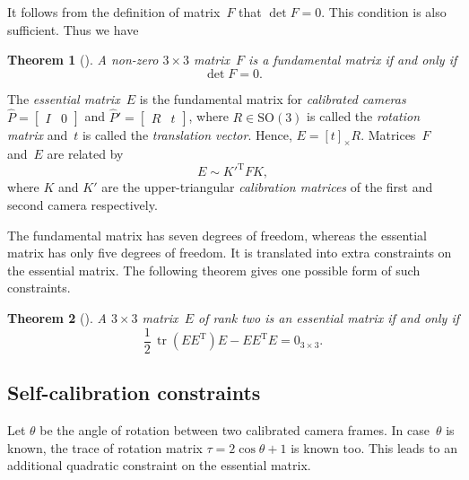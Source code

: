 \documentclass[reqno]{amsart}
\DeclareMathOperator{\tr}{tr}
\theoremstyle{plain}
\newtheorem{theorem}{Theorem}
\begin{document}
It follows from the definition of matrix~$F$ that $\det F = 0$. This condition is also sufficient. Thus we have

\begin{theorem}[\cite{HZ}]
\label{thm:fund}
A non-zero $3\times 3$ matrix~$F$ is a fundamental matrix if and only if
\begin{equation}
\det F = 0.
\end{equation}
\end{theorem}

The \emph{essential matrix}~$E$ is the fundamental matrix for \emph{calibrated cameras} $\hat P = \begin{bmatrix} I & 0 \end{bmatrix}$ and $\hat P' = \begin{bmatrix} R & t\end{bmatrix}$, where $R \in \mathrm{SO}(3)$ is called the \emph{rotation matrix} and~$t$ is called the \emph{translation vector}. Hence, $E = [t]_\times R$. Matrices~$F$ and~$E$ are related by
\begin{equation}
E \sim K'^{\mathrm T} F K,
\end{equation}
where $K$ and $K'$ are the upper-triangular \emph{calibration matrices} of the first and second camera respectively.

The fundamental matrix has seven degrees of freedom, whereas the essential matrix has only five degrees of freedom. It is translated into extra constraints on the essential matrix. The following theorem gives one possible form of such constraints.

\begin{theorem}[\cite{Maybank}]
\label{thm:essential}
A $3\times 3$ matrix~$E$ of rank two is an essential matrix if and only if
\begin{equation}
\label{eq:constrE}
\frac{1}{2}\,\tr(EE^{\mathrm T})E - EE^{\mathrm T}E = 0_{3\times 3}.
\end{equation}
\end{theorem}


\subsection{Self-calibration constraints}

Let $\theta$ be the angle of rotation between two calibrated camera frames. In case~$\theta$ is known, the trace of rotation matrix $\tau = 2\cos\theta + 1$ is known too. This leads to an additional quadratic constraint on the essential matrix.
\end{document}

